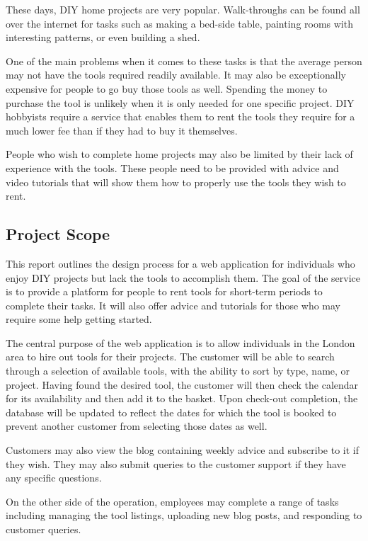 \documentclass[fontsize=11pt]{extarticle}
\numberwithin{figure}{section} %
\numberwithin{table}{section}%
\begin{document}
These days, DIY home projects are very popular. Walk-throughs can be
found all over the internet for tasks such as making a bed-side table,
painting rooms with interesting patterns, or even building a shed.

One of the main problems when it comes to these tasks is that the
average person may not have the tools required readily available. It may
also be exceptionally expensive for people to go buy those tools as
well. Spending the money to purchase the tool is unlikely when it is
only needed for one specific project. DIY hobbyists require a service
that enables them to rent the tools they require for a much lower fee
than if they had to buy it themselves.

People who wish to complete home projects may also be limited by their
lack of experience with the tools. These people need to be provided with
advice and video tutorials that will show them how to properly use the
tools they wish to rent.

\hypertarget{project-scope}{%
\subsection{Project Scope}\label{project-scope}}

This report outlines the design process for a web application for
individuals who enjoy DIY projects but lack the tools to accomplish
them. The goal of the service is to provide a platform for people to
rent tools for short-term periods to complete their tasks. It will also
offer advice and tutorials for those who may require some help getting
started.

The central purpose of the web application is to allow individuals in
the London area to hire out tools for their projects. The customer will
be able to search through a selection of available tools, with the
ability to sort by type, name, or project. Having found the desired
tool, the customer will then check the calendar for its availability and
then add it to the basket. Upon check-out completion, the database will
be updated to reflect the dates for which the tool is booked to prevent
another customer from selecting those dates as well.

Customers may also view the blog containing weekly advice and subscribe
to it if they wish. They may also submit queries to the customer support
if they have any specific questions.

On the other side of the operation, employees may complete a range of
tasks including managing the tool listings, uploading new blog posts,
and responding to customer queries.
\end{document}
